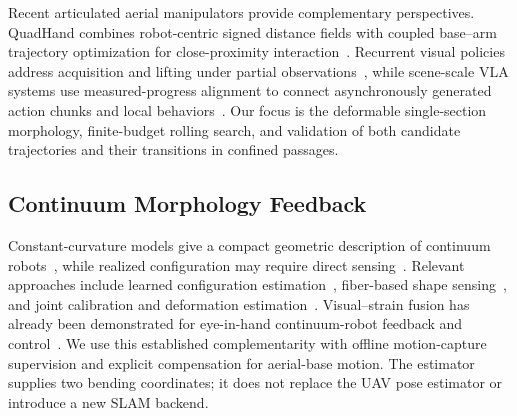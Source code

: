\documentclass[journal,twoside]{IEEEtran}
\begin{document}
Recent articulated aerial manipulators provide complementary perspectives. QuadHand combines robot-centric signed distance fields with coupled base--arm trajectory optimization for close-proximity interaction~\cite{jin2026quadhand}. Recurrent visual policies address acquisition and lifting under partial observations~\cite{jin2026visualrl}, while scene-scale VLA systems use measured-progress alignment to connect asynchronously generated action chunks and local behaviors~\cite{guo2026scenevla}. Our focus is the deformable single-section morphology, finite-budget rolling search, and validation of both candidate trajectories and their transitions in confined passages.

\subsection{Continuum Morphology Feedback}
Constant-curvature models give a compact geometric description of continuum robots~\cite{webster2010pcc}, while realized configuration may require direct sensing~\cite{shi2017survey}. Relevant approaches include learned configuration estimation~\cite{hyatt2019config}, fiber-based shape sensing~\cite{ryu2014fbg,lun2019surface}, and joint calibration and deformation estimation~\cite{alambeigi2020scade}. Visual--strain fusion has already been demonstrated for eye-in-hand continuum-robot feedback and control~\cite{wang2020eyeinhand,wang2023visualstrain}. We use this established complementarity with offline motion-capture supervision and explicit compensation for aerial-base motion. The estimator supplies two bending coordinates; it does not replace the UAV pose estimator or introduce a new SLAM backend.

\end{document}

